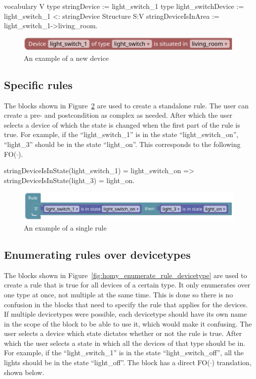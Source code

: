 \documentclass[11pt,a4paper]{report}
\newcommand{\fodot}{FO($\cdot$)\xspace}
\begin{document}
\begin{idplisting}
vocabulary V {
    type stringDevice := {light_switch_1} 
    type light_switchDevice := {light_switch_1} <: stringDevice
}
Structure S:V {
    stringDeviceIsInArea := {light_switch_1->living_room}.
}
\end{idplisting}

\begin{figure}
    \centering
    \includegraphics[width=0.8\linewidth]{images/homy_device.png}
    \caption{An example of a new device}
    \label{fig:homy_device}
\end{figure}

\subsection{Specific rules}
The blocks shown in Figure~\ref{fig:homy_single_rule} are used to create a standalone rule. The user can create a pre- and postcondition as complex as needed. After which the user selects a device of which the state is changed when the first part of the rule is true. For example, if the ``light\_switch\_1'' is in the state ``light\_switch\_on'', ``light\_3'' should be in the state ``light\_on''. This corresponds to the following \fodot.

\begin{idplisting}
stringDeviceIsInState(light_switch_1) = light_switch_on =>
stringDeviceIsInState(light_3) = light_on.
\end{idplisting}

\begin{figure}
    \centering
    \includegraphics[width=0.8\linewidth]{images/homy_single_rule.png}
    \caption{An example of a single rule}
    \label{fig:homy_single_rule}
\end{figure}

\subsection{Enumerating rules over devicetypes}
The blocks shown in Figure~\ref{fig:homy_enumerate_rule_devicetype} are used to create a rule that is true for all devices of a certain type. It only enumerates over one type at once, not multiple at the same time. This is done so there is no confusion in the blocks that need to specify the rule that applies for the devices. If multiple devicetypes were possible, each devicetype should have its own name in the scope of the block to be able to use it, which would make it confusing. The user selects a device which state dictates whether or not the rule is true. After which the user selects a state in which all the devices of that type should be in. For example, if the ``light\_switch\_1'' is in the state ``light\_switch\_off'', all the lights should be in the state ``light\_off''. The block has a direct \fodot translation, shown below.
\end{document}
